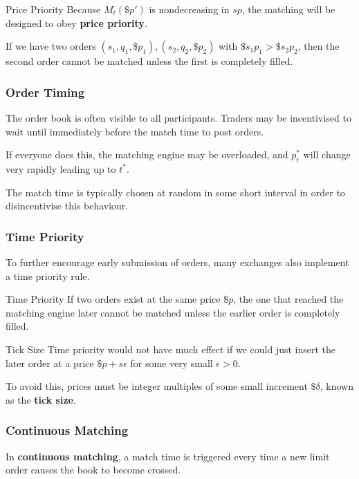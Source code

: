 \documentclass{article}
\begin{document}
\begin{block}{Price Priority}
	Because $M_t(\$p')$ is nondecreasing in $sp$, the matching will be designed to obey \textbf{price priority}.

	If we have two orders $(s_1,q_1,\$p_1), (s_2,q_2,\$p_2)$ with $\$s_1p_1 > \$s_2p_2$, then the second order cannot be matched unless the first is completely filled.
\end{block}

\subsubsection{Order Timing}
The order book is often visible to all participants. Traders may be incentivised to wait until immediately before the match time to post orders.%

If everyone does this, the matching engine may be overloaded, and $p^*_t$ will change very rapidly leading up to $t^*$.

The match time is typically chosen at random in some short interval in order to disincentivise this behaviour.

\subsubsection{Time Priority}
To further encourage early submission of orders, many exchanges also implement a time priority rule.%
\begin{block}{Time Priority}
	If two orders exist at the same price $\$p$, the one that reached the matching engine later cannot be matched unless the earlier order is completely filled.
\end{block}

\begin{block}{Tick Size}
	Time priority would not have much effect if we could just insert the later order at a price $\$p+s\epsilon$ for some very small $\epsilon>0$.%

	To avoid this, prices must be integer multiples of some small increment $\$\delta$, known as the \textbf{tick size}.%
\end{block}

\subsubsection{Continuous Matching}
In \textbf{continuous matching}, a match time is triggered every time a new limit order causes the book to become crossed.
\end{document}
